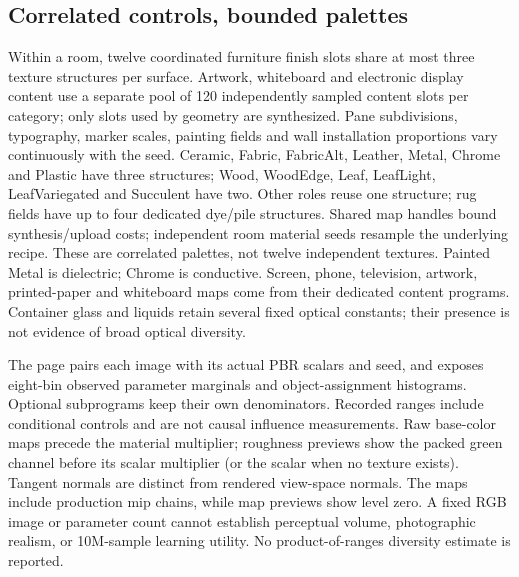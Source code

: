 \subsection{Correlated controls, bounded palettes}
Within a room, twelve coordinated furniture finish slots share at most three texture structures per surface. Artwork, whiteboard and electronic display content use a separate pool of 120 independently sampled content slots per category; only slots used by geometry are synthesized. Pane subdivisions, typography, marker scales, painting fields and wall installation proportions vary continuously with the seed. Ceramic, Fabric, FabricAlt, Leather, Metal, Chrome and Plastic have three structures; Wood, WoodEdge, Leaf, LeafLight, LeafVariegated and Succulent have two. Other roles reuse one structure; rug fields have up to four dedicated dye/pile structures. Shared map handles bound synthesis/upload costs; independent room material seeds resample the underlying recipe. These are correlated palettes, not twelve independent textures. Painted Metal is dielectric; Chrome is conductive. Screen, phone, television, artwork, printed-paper and whiteboard maps come from their dedicated content programs. Container glass and liquids retain several fixed optical constants; their presence is not evidence of broad optical diversity.

The page pairs each image with its actual PBR scalars and seed, and exposes eight-bin observed parameter marginals and object-assignment histograms. Optional subprograms keep their own denominators. Recorded ranges include conditional controls and are not causal influence measurements. Raw base-color maps precede the material multiplier; roughness previews show the packed green channel before its scalar multiplier (or the scalar when no texture exists). Tangent normals are distinct from rendered view-space normals. The maps include production mip chains, while map previews show level zero. A fixed RGB image or parameter count cannot establish perceptual volume, photographic realism, or 10M-sample learning utility. No product-of-ranges diversity estimate is reported.

